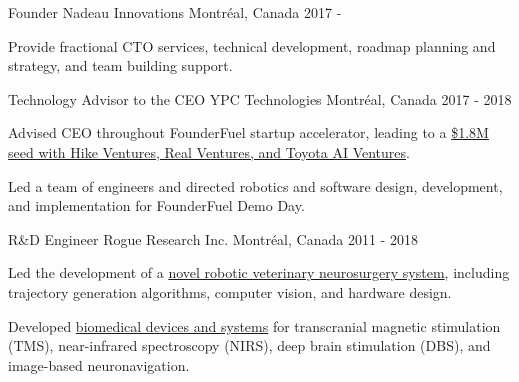 \begin{cventries}
    \cventry
    {Founder}
    {Nadeau Innovations}
    {Montréal, Canada}
    {2017 - }
    {
        \begin{cvitems}
            \item{Provide fractional CTO services, technical development, roadmap planning and strategy, and team building support.}
        \end{cvitems}
    }

    \cventry
    {Technology Advisor to the CEO}
    {YPC Technologies}
    {Montréal, Canada}
    {2017 - 2018}
    {
        \begin{cvitems}
            \item{Advised CEO throughout FounderFuel startup accelerator, leading to a \href{https://www.ypc-technologies.com/ypc-seed-round-oct2020}{\$1.8M seed with Hike Ventures, Real Ventures, and Toyota AI Ventures}.}
            \item{Led a team of engineers and directed robotics and software design, development, and implementation for FounderFuel Demo Day.}
        \end{cvitems}
    }

    \cventry
    {R\&D Engineer}
    {Rogue Research Inc.}
    {Montréal, Canada}
    {2011 - 2018}
    {
        \begin{cvitems}
            \item{Led the development of a \href{https://www.nicholasnadeau.com/publication/nadeau-2017-characterization/}{novel robotic veterinary neurosurgery system}, including trajectory generation algorithms, computer vision, and hardware design.}
            \item{Developed \href{https://www.rogue-research.com/}{biomedical devices and systems} for transcranial magnetic stimulation (TMS), near-infrared spectroscopy (NIRS), deep brain stimulation (DBS), and image-based neuronavigation.}
        \end{cvitems}
    }

\end{cventries}
